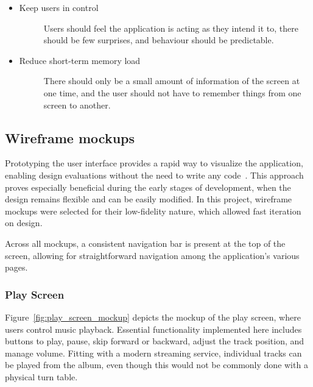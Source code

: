 \begin{itemize}
\begin{description}
    \end{description}
    \item Keep users in control
    \begin{description}
        \item[] Users should feel the application is acting as they intend it to, there should be few surprises, and behaviour should be predictable.
    \end{description}
    \item Reduce short-term memory load
    \begin{description}
        \item[] There should only be a small amount of information of the screen at one time, and the user should not have to remember things from one screen to another.
    \end{description}
\end{itemize}
\fi

\subsection{Wireframe mockups}
Prototyping the user interface provides a rapid way to visualize the application, enabling design evaluations without the need to write any code~\cite{WILSON1988859}. This approach proves especially beneficial during the early stages of development, when the design remains flexible and can be easily modified. In this project, wireframe mockups were selected for their low-fidelity nature, which allowed fast iteration on design.

Across all mockups, a consistent navigation bar is present at the top of the screen, allowing for straightforward navigation among the application's various pages.

\subsubsection{Play Screen}
Figure~\ref{fig:play_screen_mockup} depicts the mockup of the play screen, where users control music playback. Essential functionality implemented here includes buttons to play, pause, skip forward or backward, adjust the track position, and manage volume. Fitting with a modern streaming service, individual tracks can be played from the album, even though this would not be commonly done with a physical turn table.

